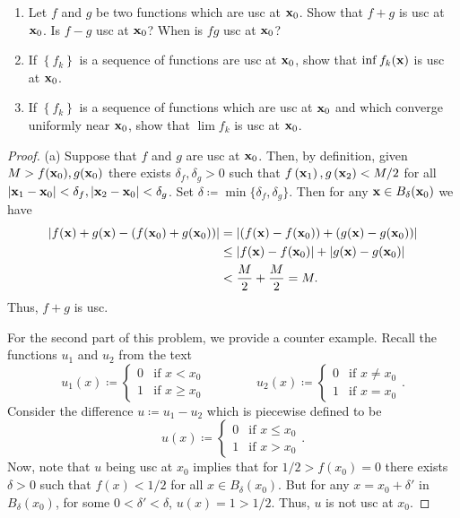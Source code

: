 \begin{problem}
\begin{enumerate}[label=(\alph*)]
\item Let $f$ and $g$ be two functions which are usc at $\mathbf{x}_0$. Show that
  $f+g$ is usc at $\mathbf{x}_0$. Is $f-g$ usc at $\mathbf{x}_0$? When is $fg$ usc at
  $\mathbf{x}_0$?
\item If $\left\{f_k\right\}$ is a sequence of functions are usc at
  $\mathbf{x}_0$, show that $\inf f_k(\mathbf{x})$ is usc at $\mathbf{x}_0$.
\item If $\left\{f_k\right\}$ is a sequence of functions which are usc at
  $\mathbf{x}_0$ and which converge uniformly near $\mathbf{x}_0$, show that $\lim f_k$
  is usc at $\mathbf{x}_0$.
\end{enumerate}
\end{problem}
\begin{proof}
(a) Suppose that $f$ and $g$ are usc at $\mathbf{x}_0$. Then, by definition,
given $M>f(\mathbf{x}_0),g(\mathbf{x}_0)$ there exists $\delta_f,\delta_g>0$ such that
$f\left(\mathbf{x}_1\right),g\left(\mathbf{x}_2\right)<M/2$ for all
$\left|\mathbf{x}_1-\mathbf{x}_0\right|<\delta_f,\left|\mathbf{x}_2-\mathbf{x}_0\right|<\delta_g$. Set
$\delta\coloneqq\min\{\delta_f,\delta_g\}$. Then for any $\mathbf{x}\in
B_\delta(\mathbf{x}_0)$ we have
\begin{align*}
\left|f(\mathbf{x})+g(\mathbf{x})-\left(f(\mathbf{x}_0)+g(\mathbf{x}_0)\right)\right|
&=\left|\left(f(\mathbf{x})-f(\mathbf{x}_0)\right)+\left(g(\mathbf{x})-g(\mathbf{x}_0)\right)\right|\\
&\leq\left|f(\mathbf{x})-f(\mathbf{x}_0)\right|+\left|g(\mathbf{x})-g(\mathbf{x}_0)\right|\\
&<\frac{M}{2}+\frac{M}{2}=M.
\end{align*}
Thus, $f+g$ is usc.

For the second part of this problem, we provide a counter example. Recall
the functions $u_1$ and $u_2$ from the text
\begin{equation}
\label{eq:u-1-u-2-usc}
u_1(x)\coloneqq
\begin{cases}
0&\text{if $x<x_0$}\\
1&\text{if $x\geq x_0$}
\end{cases}
\qquad\qquad
u_2(x)\coloneqq
\begin{cases}
0&\text{if $x\neq x_0$}\\
1&\text{if $x=x_0$}
\end{cases}.
\end{equation}
Consider the difference $u\coloneqq u_1-u_2$ which is piecewise defined to
be
\begin{equation}
  \label{eq:u-piecewise}
u(x)\coloneqq\begin{cases}
0&\text{if $x\leq x_0$}\\
1&\text{if $x>x_0$}
\end{cases}.
\end{equation}
Now, note that $u$ being usc at $x_0$ implies that for $1/2>f(x_0)=0$ there
exists $\delta>0$ such that $f(x)<1/2$ for all $x\in B_\delta(x_0)$. But
for any $x=x_0+\delta'$ in $B_\delta(x_0)$, for some $0<\delta'<\delta$,
$u(x)=1>1/2$. Thus, $u$ is not usc at $x_0$.


\end{proof}
